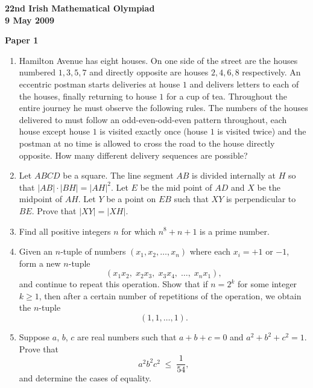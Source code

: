 \documentclass[12pt]{article}
\begin{document}
\begin{center}
{\large\bfseries 22nd Irish Mathematical Olympiad\\9 May 2009}
\end{center}
\bigskip\noindent\textbf{Paper 1}\bigskip
\begin{enumerate}
\item Hamilton Avenue has eight houses. On one side of the street are the houses numbered $1, 3, 5, 7$ and directly opposite are houses $2, 4, 6, 8$ respectively. An eccentric postman starts deliveries at house $1$ and delivers letters to each of the houses, finally returning to house $1$ for a cup of tea. Throughout the entire journey he must observe the following rules. The numbers of the houses delivered to must follow an odd-even-odd-even pattern throughout, each house except house $1$ is visited exactly once (house $1$ is visited twice) and the postman at no time is allowed to cross the road to the house directly opposite. How many different delivery sequences are possible?

\item Let $ABCD$ be a square. The line segment $AB$ is divided internally at $H$ so that $|AB|\cdot|BH| = |AH|^2$. Let $E$ be the mid point of $AD$ and $X$ be the midpoint of $AH$. Let $Y$ be a point on $EB$ such that $XY$ is perpendicular to $BE$. Prove that $|XY| = |XH|$.

\item Find all positive integers $n$ for which $n^8 + n + 1$ is a prime number.

\item Given an $n$-tuple of numbers $(x_1, x_2, \ldots, x_n)$ where each $x_i = +1$ or $-1$, form a new $n$-tuple
\[
(x_1 x_2,\; x_2 x_3,\; x_3 x_4,\; \ldots,\; x_n x_1),
\]
and continue to repeat this operation. Show that if $n = 2^k$ for some integer $k \ge 1$, then after a certain number of repetitions of the operation, we obtain the $n$-tuple
\[
(1, 1, \ldots, 1).
\]

\item Suppose $a$, $b$, $c$ are real numbers such that $a + b + c = 0$ and $a^2 + b^2 + c^2 = 1$. Prove that
\[
a^2 b^2 c^2 \;\le\; \frac{1}{54},
\]
and determine the cases of equality.
\end{enumerate}
\end{document}
